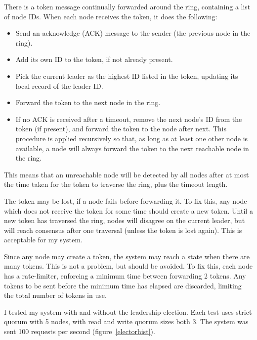 \documentclass[12pt,a4paper,twoside,openany]{report}
\begin{document}
There is a token message continually forwarded around the ring, containing a list of node IDs. When each node receives the token, it does the following:

\begin{itemize}
\item
Send an acknowledge (ACK) message to the sender (the previous node in the ring).

\item
Add its own ID to the token, if not already present.

\item
Pick the current leader as the highest ID listed in the token, updating its local record of the leader ID.

\item
Forward the token to the next node in the ring.

\item
If no ACK is received after a timeout, remove the next node's ID from the token (if present), and forward the token to the node after next. This procedure is applied recursively so that, as long as at least one other node is available, a node will always forward the token to the next reachable node in the ring.

\end{itemize}

This means that an unreachable node will be detected by all nodes after at most the time taken for the token to traverse the ring, plus the timeout length.

The token may be lost, if a node fails before forwarding it. To fix this, any node which does not receive the token for some time should create a new token. Until a new token has traversed the ring, nodes will disagree on the current leader, but will reach consensus after one traversal (unless the token is lost again). This is acceptable for my system.

Since any node may create a token, the system may reach a state when there are many tokens. This is not a problem, but should be avoided. To fix this, each node has a rate-limiter, enforcing a minimum time between forwarding 2 tokens. Any tokens to be sent before the minimum time has elapsed are discarded, limiting the total number of tokens in use.

I tested my system with and without the leadership election. Each test uses strict quorum with 5 nodes, with read and write quorum sizes both 3. The system was sent 100 requests per second (figure~\ref{electorhist}).
\end{document}
